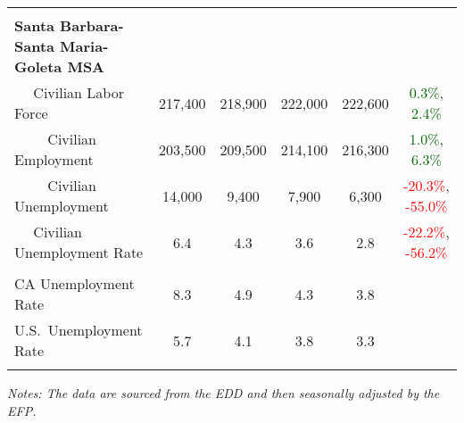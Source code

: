 \documentclass[12pt]{article}
\begin{document}
\begin{landscape}
\begin{table}
\begin{tabular}{|l|c|c|c|c|c|}
&&&&& \\
\textbf{Santa Barbara-Santa Maria-Goleta MSA} &&&&& \\
$\quad$ Civilian Labor Force &217,400 & 218,900 & 222,000 & 222,600 & \textcolor{darkgreen}{0.3\%}, \textcolor{darkgreen}{2.4\%} \\
$\qquad$ \small Civilian Employment &203,500 & 209,500 & 214,100 & 216,300 & \textcolor{darkgreen}{1.0\%}, \textcolor{darkgreen}{6.3\%} \\
$\qquad$ \small Civilian Unemployment &14,000 & 9,400 & 7,900 & 6,300 & \textcolor{red}{-20.3\%}, \textcolor{red}{-55.0\%} \\
$\quad$ Civilian Unemployment Rate &6.4 & 4.3 & 3.6 & 2.8 & \textcolor{red}{-22.2\%}, \textcolor{red}{-56.2\%} \\
&&&&& \\
CA Unemployment Rate & 8.3 & 4.9 & 4.3 & 3.8 & \\
U.S.\ Unemployment Rate & 5.7 & 4.1 & 3.8 & 3.3 & \\
& & & & & \\ \hline \hline
\end{tabular}
\par
\vspace{.5em}
\footnotesize
\textit{Notes: The data are sourced from the EDD and then seasonally adjusted by the EFP.}
\end{table}
\end{landscape}
\end{document}
